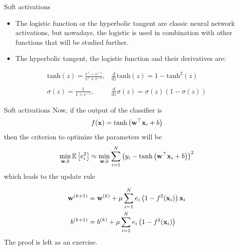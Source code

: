 \documentclass{beamer}
\begin{document}
\begin{frame}{Soft activations}
\begin{itemize}
\item The logistic function or the hyperbolic tangent  are classic neural network activations, but nowadays, the logistic is used in combination with other functions that will be studied further. 
\item The hyperbolic tangent, the logistic function and their derivatives are:

\end{itemize}

\begin{equation}
    \begin{array}{ll}
        \text{tanh}\left(z\right)=\frac{e^z-e^{-z}}{e^z+e^{-z}},&\frac{d}{dz} \text{tanh}(z) = 1-\text{tanh}^2(z)\\
        &\\
            \sigma(z)=\frac{1}{1+e^{-z}},&\frac{d}{dz}  \sigma(z)= \sigma(z)\left(1-\sigma(z)\right)
    \end{array}
    \end{equation}
    
\end{frame}

\begin{frame}{Soft activations}
Now, if the output of the classifier is 
\begin{equation}
    f({\bf x}) =  \text{tanh}\left( {\bf w}^\top {\bf x}_i +b\right)
\end{equation}
then the criterion to optimize the parameters will be  \begin{equation}
    \min_{{\bf w}, b} \mathbb{E}\left[e_i^2\right] \approx \min_{{\bf w}, b}  \sum_{i=1}^N  \left( y_i - \text{tanh}\left( {\bf w}^\top {\bf x}_i +b \right)\right)^2
\end{equation}
which leads to the update rule

\begin{equation}\label{eq:batch_update_w}
\begin{split}
    {\bf w}^{(k+1)}&={\bf w}^{(k)}+\mu\sum_{i=1}^N e_i\left(1-f^2({\bf x}_i)\right){\bf x}_i\\
    b^{(k+1)}&=b^{(k)}+\mu\sum_{i=1}^N e_i\left(1-f^2({\bf x}_i)\right)
\end{split}
\end{equation}
The proof is left as an exercise.
\end{frame}
\end{document}
